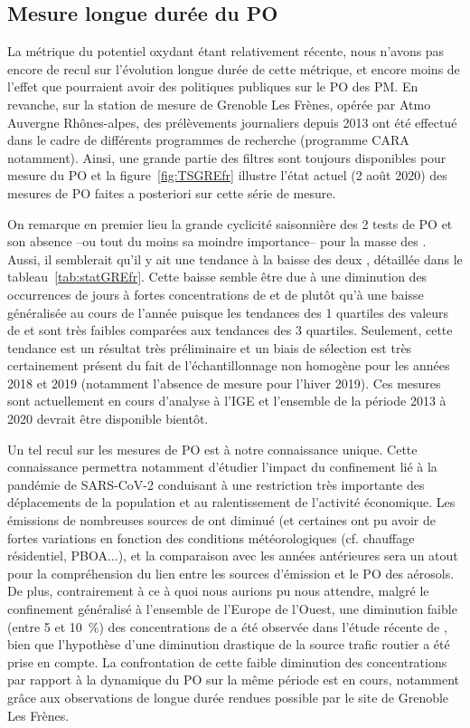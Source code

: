 \clearpage
\subsection{Mesure longue durée du PO}%
\label{sub:observation_longue_duree}

La métrique du potentiel oxydant étant relativement récente, nous n'avons pas encore de
recul sur l'évolution longue durée de cette métrique, et encore moins de l'effet que pourraient avoir des
politiques publiques sur le PO des PM. En revanche, sur la station de mesure de Grenoble
Les Frènes, opérée par Atmo Auvergne Rhônes-alpes, des prélèvements journaliers depuis 2013
ont été effectué dans le cadre de différents programmes de recherche (programme CARA
notamment). Ainsi, une grande partie des filtres sont toujours disponibles pour mesure du PO et
la figure~\ref{fig:TSGREfr} illustre l'état actuel (2 août 2020) des mesures de PO faites a
posteriori sur cette série de mesure.

On remarque en premier lieu la grande cyclicité saisonnière des 2 tests de PO et son absence --ou
tout du moins sa moindre importance-- pour la masse des \PMdix.
Aussi, il semblerait qu'il y ait une tendance à la baisse des deux \POv, détaillée dans le
tableau~\ref{tab:statGREfr}. Cette baisse semble être due à une diminution des occurrences
de jours à fortes concentrations de \PMdix{} et de \POv{} plutôt qu'à une baisse
généralisée au cours de l'année puisque les tendances des 1\iers{} quartiles des valeurs de
\POv{} et \PMdix{} sont très faibles comparées aux tendances des 3\iemes{} quartiles.
Seulement, cette tendance est un résultat très préliminaire et un biais de sélection est
très certainement présent du fait de l'échantillonnage non homogène pour les années 2018
et 2019 (notamment l'absence de mesure pour l'hiver 2019).
Ces mesures sont actuellement en cours d'analyse à l'IGE et l'ensemble de la période 2013
à 2020 devrait être disponible bientôt.

Un tel recul sur les mesures de PO est à notre connaissance unique. Cette
connaissance permettra notamment d'étudier l'impact du confinement lié à la pandémie de
SARS-CoV-2 conduisant à une restriction très importante des déplacements de la population
et au ralentissement de l'activité économique. Les émissions de nombreuses sources de \PMdix{} ont diminué (et certaines ont pu avoir de fortes variations en fonction des conditions météorologiques (cf. chauffage résidentiel, PBOA...), et la comparaison avec les années antérieures sera un atout pour la
compréhension du lien entre les sources d'émission et le PO des aérosols. De plus,
contrairement à ce à quoi nous aurions pu nous attendre, malgré le confinement
généralisé à l'ensemble de l'Europe de l'Ouest, une diminution faible (entre 5 et \SI{10}{\percent})
des concentrations de \PMdc{} a été observée dans l'étude récente de \cite{menutImpact2020}, bien que
l'hypothèse d'une diminution drastique de la source trafic routier a été prise en compte.
La confrontation de cette faible diminution des concentrations \PMdc{} par rapport à la
dynamique du PO sur la même période est en cours, notamment grâce aux
observations de longue durée rendues possible par le site de Grenoble Les Frènes.

